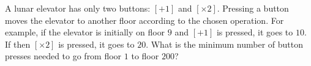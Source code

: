 A lunar elevator has only two buttons: $[+1]$ and $[\times2]$. Pressing a button moves the elevator to another floor according to the chosen operation. For example, if the elevator is initially on floor $9$ and $[+1]$ is pressed, it goes to $10$. If then $[\times2]$ is pressed, it goes to $20$. What is the minimum number of button presses needed to go from floor $1$ to floor $200$?
